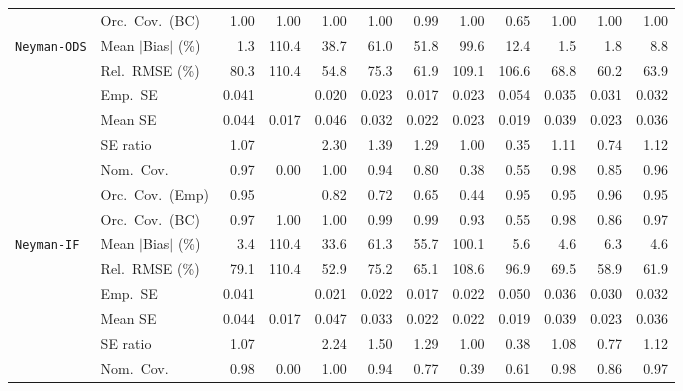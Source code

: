 \begin{landscape}
\begin{longtable}{llrrrrrrrrrr}
 & Orc.\ Cov.\ (BC) & \cellcolor{ranktwo}1.00 & \cellcolor{rankthree}1.00 & 1.00 & 1.00 & \cellcolor{rankone}0.99 & 1.00 & 0.65 & 1.00 & 1.00 & 1.00 \\
\addlinespace[2pt]
\quad \texttt{Neyman-ODS} & Mean $|$Bias$|$ (\%) & \cellcolor{rankone}1.3 & 110.4 & 38.7 & 61.0 & 51.8 & 99.6 & 12.4 & \cellcolor{ranktwo}1.5 & \cellcolor{rankthree}1.8 & 8.8 \\
 & Rel.\ RMSE (\%) & 80.3 & 110.4 & \cellcolor{rankone}54.8 & 75.3 & \cellcolor{rankthree}61.9 & 109.1 & 106.6 & 68.8 & \cellcolor{ranktwo}60.2 & 63.9 \\
 & Emp.\ SE & 0.041 &  & 0.020 & 0.023 & 0.017 & 0.023 & 0.054 & 0.035 & 0.031 & 0.032 \\
 & Mean SE & 0.044 & 0.017 & 0.046 & 0.032 & 0.022 & 0.023 & 0.019 & 0.039 & 0.023 & 0.036 \\
 & SE ratio & \cellcolor{ranktwo}1.07 &  & 2.30 & 1.39 & 1.29 & \cellcolor{rankone}1.00 & 0.35 & \cellcolor{rankthree}1.11 & 0.74 & 1.12 \\
 & Nom.\ Cov. & \cellcolor{rankthree}0.97 & 0.00 & 1.00 & \cellcolor{rankone}0.94 & 0.80 & 0.38 & 0.55 & 0.98 & 0.85 & \cellcolor{ranktwo}0.96 \\
 & Orc.\ Cov.\ (Emp) & \cellcolor{ranktwo}0.95 &  & 0.82 & 0.72 & 0.65 & 0.44 & \cellcolor{rankone}0.95 & \cellcolor{rankthree}0.95 & 0.96 & 0.95 \\
 & Orc.\ Cov.\ (BC) & \cellcolor{ranktwo}0.97 & 1.00 & 1.00 & 0.99 & 0.99 & \cellcolor{rankthree}0.93 & 0.55 & 0.98 & 0.86 & \cellcolor{rankone}0.97 \\
\addlinespace[2pt]
\quad \texttt{Neyman-IF} & Mean $|$Bias$|$ (\%) & \cellcolor{rankone}3.4 & 110.4 & 33.6 & 61.3 & 55.7 & 100.1 & 5.6 & \cellcolor{ranktwo}4.6 & 6.3 & \cellcolor{rankthree}4.6 \\
 & Rel.\ RMSE (\%) & 79.1 & 110.4 & \cellcolor{rankone}52.9 & 75.2 & 65.1 & 108.6 & 96.9 & 69.5 & \cellcolor{ranktwo}58.9 & \cellcolor{rankthree}61.9 \\
 & Emp.\ SE & 0.041 &  & 0.021 & 0.022 & 0.017 & 0.022 & 0.050 & 0.036 & 0.030 & 0.032 \\
 & Mean SE & 0.044 & 0.017 & 0.047 & 0.033 & 0.022 & 0.022 & 0.019 & 0.039 & 0.023 & 0.036 \\
 & SE ratio & \cellcolor{ranktwo}1.07 &  & 2.24 & 1.50 & 1.29 & \cellcolor{rankone}1.00 & 0.38 & \cellcolor{rankthree}1.08 & 0.77 & 1.12 \\
 & Nom.\ Cov. & 0.98 & 0.00 & 1.00 & \cellcolor{rankone}0.94 & 0.77 & 0.39 & 0.61 & \cellcolor{rankthree}0.98 & 0.86 & \cellcolor{ranktwo}0.97 \\

\end{longtable}
\end{landscape}
